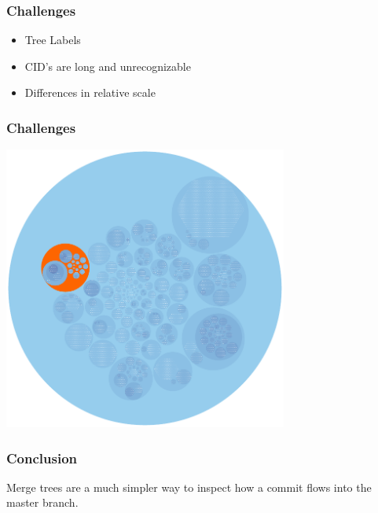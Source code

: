 \documentclass[15pt]{beamer}
\begin{document}
\begin{frame}
  \frametitle{Challenges}
  \begin{itemize}
    \item Tree Labels
    \item CID's are long and unrecognizable
    \item Differences in relative scale
  \end{itemize}
\end{frame}

\begin{frame}
  \frametitle{Challenges}
  \begin{center}
    \includegraphics[width=0.7\textwidth]{figures/4dc4_tree.pdf}
  \end{center}
\end{frame}

\begin{frame}
  \frametitle{Conclusion}
  Merge trees are a much simpler way to inspect how a commit flows into the master
  branch.

\end{frame}
\end{document}
